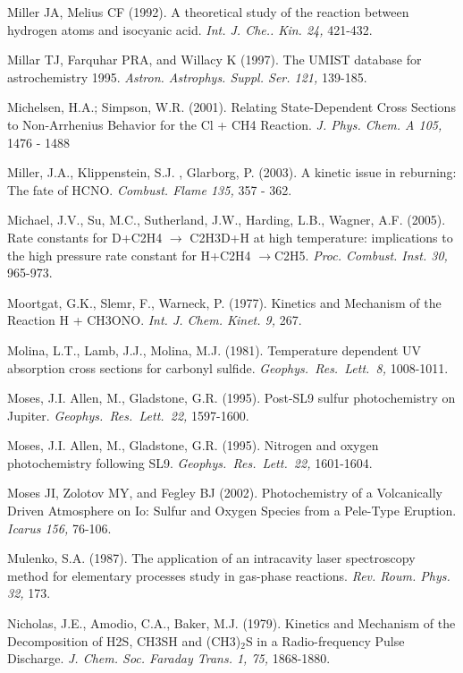 \documentclass[12pt,landscape]{article}
\newcounter{reaction}
\newcounter{photo}
\begin{document}
Miller JA, Melius CF (1992). A theoretical study of the reaction between hydrogen atoms and isocyanic acid.  {\em Int. J. Che.. Kin. 24,} 421-432.

Millar TJ, Farquhar PRA, and Willacy K (1997). The UMIST database for astrochemistry 1995. {\em Astron. Astrophys. Suppl. Ser. 121,} 139-185.

Michelsen, H.A.; Simpson, W.R. (2001). Relating State-Dependent Cross Sections to Non-Arrhenius Behavior for the Cl + CH4 Reaction. {\em J. Phys. Chem. A 105,} 1476 - 1488

Miller, J.A., Klippenstein, S.J. , Glarborg, P. (2003).   A kinetic issue in reburning: The fate of HCNO.  {\em Combust. Flame 135,} 357 - 362.

Michael, J.V., Su, M.C., Sutherland, J.W., Harding, L.B., Wagner, A.F.  (2005). Rate constants for D+C2H4 $\rightarrow$ C2H3D+H at high temperature: implications to the high pressure rate constant for H+C2H4 $\rightarrow$C2H5.  {\em Proc. Combust. Inst. 30,} 965-973.

Moortgat, G.K., Slemr, F., Warneck, P. (1977). Kinetics and Mechanism of the Reaction H + CH3ONO. {\em  Int. J. Chem. Kinet.  9,} 267.

Molina, L.T., Lamb, J.J., Molina, M.J.  (1981). Temperature dependent UV absorption cross sections for carbonyl sulfide. {\em Geophys.\ Res.\ Lett.\ 8,} 1008-1011.

Moses, J.I. Allen, M., Gladstone, G.R. (1995).	Post-SL9 sulfur photochemistry on Jupiter. {\em Geophys.\ Res.\ Lett.\ 22,} 1597-1600.

Moses, J.I. Allen, M., Gladstone, G.R. (1995).	Nitrogen and oxygen photochemistry following SL9. {\em Geophys.\ Res.\ Lett.\ 22,} 1601-1604.

Moses JI, Zolotov MY, and Fegley BJ (2002). Photochemistry of a Volcanically Driven Atmosphere on Io: Sulfur and Oxygen Species from a Pele-Type Eruption. {\em Icarus 156,} 76-106.

Mulenko, S.A. (1987). The application of an intracavity laser spectroscopy method for elementary processes study in gas-phase reactions. {\em Rev. Roum. Phys. 32,} 173.

Nicholas, J.E., Amodio, C.A., Baker, M.J. (1979).  Kinetics and Mechanism of the Decomposition of H2S, CH3SH and (CH3)$_2$S in a Radio-frequency Pulse Discharge. {\em J. Chem. Soc. Faraday Trans. 1, 75,} 1868-1880.
\end{document}
